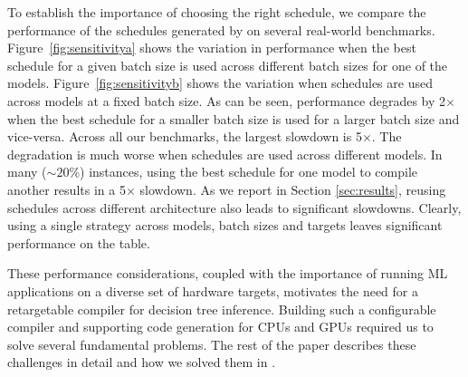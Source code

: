 To establish the importance of choosing the right schedule, we
compare the performance of the schedules generated by \Treebeard{}
on several real-world benchmarks. 
Figure~\ref{fig:sensitivitya} shows the
variation in performance when the best schedule for a given batch 
size is used across different batch sizes for one of the models. 
Figure~\ref{fig:sensitivityb} shows the variation when schedules 
are used across models at a fixed batch size.
As can be seen, performance degrades by 2$\times$ when the best schedule for a
smaller batch size is used for a larger batch size and vice-versa.
Across all our benchmarks, the largest slowdown is 5$\times$.  %
The degradation is much worse when schedules are used across different models.
In many ($\sim20$\%) instances, using the best schedule for one model 
to compile another results in a 5$\times$ slowdown.
As we report in Section \ref{sec:results}, reusing schedules across
different architecture also leads to significant slowdowns.
Clearly, using a single strategy across models, batch sizes and targets
leaves significant performance on the table. 

These performance considerations, coupled with 
the importance of running ML applications on a diverse set of hardware targets,
motivates the need for a retargetable compiler for decision tree inference.
Building such a configurable compiler and supporting code generation for CPUs and GPUs 
required us to solve several fundamental problems. 
The rest of the paper describes these challenges in detail and how we
solved them in \Treebeard{}.

